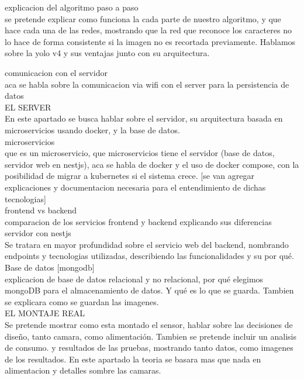 explicacion del algoritmo paso a paso \\

se pretende explicar como funciona la cada parte de nuestro algoritmo, y que hace cada una de las redes, mostrando que la red que reconoce los caracteres no lo hace de forma consistente si la imagen no es recortada previamente. Hablamos sobre la yolo v4 y sus ventajas junto con su arquitectura.

comunicacion con el servidor \\

aca se habla sobre la comunicacion via wifi con el server para la persistencia de datos \\

EL SERVER \\

En este apartado se busca hablar sobre el servidor, su arquitectura basada en microservicios usando docker, y la base de datos. \\

microservicios \\

que es un microservicio, que microservicios tiene el servidor (base de datos, servidor web en nestjs), aca se habla de docker y el uso de docker compose, con la posibilidad de migrar a kubernetes si el sistema crece. [se van agregar explicaciones y documentacion necesaria para el 
entendimiento de dichas tecnologias] \\

frontend vs backend \\

comparacion de los servicios frontend y backend explicando sus diferencias \\

servidor con nestjs \\

Se tratara en mayor profundidad sobre el servicio web del backend, nombrando endpoints y tecnologias utilizadas, describiendo las funcionalidades y su por qué. \\

Base de datos [mongodb] \\

explicacion de base de datos relacional y no relacional, por qué elegimos mongoDB para el almacenamiento de datos. Y qué es lo que se guarda. Tambien se explicara como se guardan las imagenes. \\

EL MONTAJE REAL \\

Se pretende mostrar como esta montado el sensor, hablar sobre las decisiones de diseño, tanto 
camara, como alimentación. Tambien se pretende incluir un analisis de consumo. y resultados de las pruebas, mostrando tanto datos, como imagenes de los resultados. En este apartado la teoria se basara mas que nada en alimentacion y detalles sombre las camaras. \\





